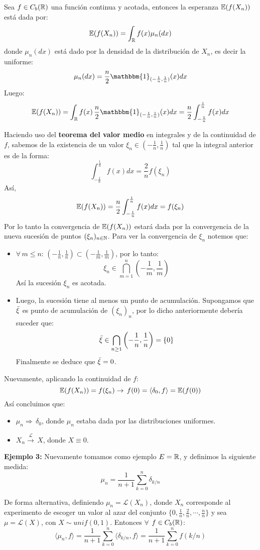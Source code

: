 Sea $f \in C_b(\mathbb R)$ una función continua y acotada, entonces la esperanza $\mathbb E(f(X_n))$ está dada por:
\[\mathbb E(f(X_n)) = \int_{\mathbb R}f(x)\mu_n(dx)\]
donde $\mu_n(dx)$ está dado por la densidad de la distribución de $X_n$, es decir la uniforme:\\ $$\mu_n(dx) = \frac{n}{2} \mathbbm{1}_{(-\frac{1}{n},\frac{1}{n})}(x)dx$$ 
Luego:
\[\E(f(X_n)) = \int_{\R}f(x)\,\frac{n}{2}\mathbbm{1}_{(-\frac{1}{n},\frac{1}{n})}(x)dx = \frac{n}{2}\int_{-\frac{1}{n}}^{\frac{1}{n}}f(x)dx\]

Haciendo uso del \textbf{teorema del valor medio} en integrales y de la continuidad de $f$, sabemos de la existencia de un valor $\xi_n \in (-\frac{1}{n},\frac{1}{n})$ tal que la integral anterior es de la forma:
\[\int_{-\frac{1}{n}}^{\frac{1}{n}}f(x)dx = \frac{2}{n}f(\xi_n)\]
Así,
\[\mathbb E(f(X_n)) = \frac{n}{2}\int_{-\frac{1}{n}}^{\frac{1}{n}}f(x)dx = f(\xi_n)\]
Por lo tanto la convergencia de $\mathbb E(f(X_n))$ estará dada por la convergencia de la nueva sucesión de puntos $(\xi_n)_{n\in\mathbb N}$. Para ver la convergencia de $\xi_n$ notemos que:
\begin{itemize}
    \item $\forall\,m\leq n$: $\left(-\frac{1}{n},\frac{1}{n}\right)\subset \left(-\frac{1}{m},\frac{1}{m}\right)$, por lo tanto:
    \[\xi_n \in \bigcap_{m=1}^{n}\left(-\frac{1}{m},\frac{1}{m}\right)\]
    Así la sucesión $\xi_n$ es acotada.
    \item Luego, la sucesión tiene al menos un punto de acumulación. Supongamos que $\Bar{\xi}$ es punto de acumulación de $(\xi_n)_n$, por lo dicho anteriormente debería suceder que:
    \[\Bar{\xi} \in \bigcap_{n\geq 1}\left(-\frac{1}{n},\frac{1}{n}\right) = \{0\}\]
    Finalmente se deduce que $\Bar{\xi}=0$.
\end{itemize}
Nuevamente, aplicando la continuidad de $f$:
\[\mathbb E(f(X_n)) = f(\xi_n) \rightarrow\,f(0) = \langle \delta_{0},f\rangle = \mathbb E(f(0))\]
\newline
Así concluimos que:
\begin{itemize}
    \item $\mu_n \Rightarrow\,\delta_{0}$, donde $\mu_n$ estaba dada por las distribuciones uniformes.
    \item $X_n \xrightarrow{\mathcal{L}}\,X$, donde $X\equiv 0$.
\end{itemize}
\textbf{Ejemplo 3:}
    Nuevamente tomamos como ejemplo $E=\mathbb R$, y definimos la siguiente medida:
    \[\mu_n = \frac{1}{n+1}\sum_{k=0}^{n}\delta_{k/n}\]
    
    De forma alternativa, definiendo $\mu_n = \mathcal{L}(X_n)$, donde $X_n$ corresponde al experimento de escoger un valor al azar del conjunto $\{0,\frac{1}{n},\frac{2}{n},\cdots,\frac{n}{n}\}$ y sea $\mu = \mathcal{L}(X)$, con $X\sim unif(0,1)$. Entonces $\forall$ $f\in C_b(\mathbb R)$:
    \[\langle \mu_n ,f\rangle = \frac{1}{n+1}\sum_{k=0}^{n} \langle \delta_{k/n},f\rangle = \frac{1}{n+1}\sum_{k=0}^{n}f(k/n)\]
    

